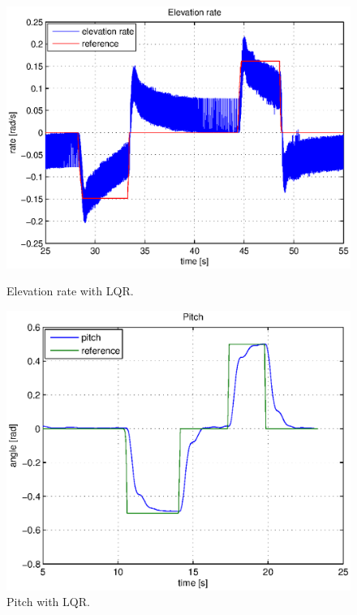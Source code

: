 \begin{figure}[h!]
    \begin{minipage}{.45\textwidth}
	    \includegraphics[width=1\textwidth]{plots/part3/part2/Elevationrate.eps}
	    \caption{Elevation rate with LQR.}
        \label{fig:Elevationrate_p}
    \end{minipage}\hspace{0.1\textwidth}%
    \begin{minipage}{.45\textwidth}
        \centering
		\includegraphics[width=1\textwidth]{plots/part3/part2/Pitch.eps}
	    \caption{Pitch with LQR.}
        \label{fig:Pitch_p}
    \end{minipage}
\end{figure}
\medskip

